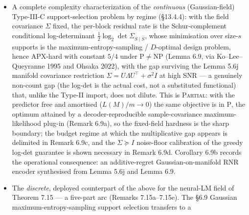 \documentclass[
]{article}
\begin{document}
\begin{itemize}
  (Theorem 6.8), and an extension of the same APX-hardness constant
  to the \emph{bit-cost} objective $L^{\mathrm{bit}} =
  L_{\mathrm{sym}} \cdot \lceil \log_2(|\Sigma|+K) \rceil$ within the
  Charikar normal-form grammar class on Berman-Karpinski-hard
  instances (Lemma 6.8b), via a ratio-preserving reduction exploiting
  monotonicity of $L^{\mathrm{bit}}$ in the vertex-cover size
  $|\sigma|$. The 8569/8568 constant derives from the
  Berman-Karpinski (1999) bound on Vertex-Cover-3 inapproximability
  propagated through the $15|V|+3|E|+k$ encoding overhead. The
  fixed-byte-alphabet case requires a fresh gap-preserving
  construction and we do not claim a specific constant for it;
  unrestricted bit-cost APX-hardness over all (non-Charikar-format)
  grammars and unrestricted-predictor joint hardness remain open.
\item
  A complete complexity characterization of the \emph{continuous}
  (Gaussian-field) Type-III-C support-selection problem by regime
  (§13.4.4): with the field covariance $\Sigma$ fixed, the per-block
  residual rate is the Schur-complement conditional log-determinant
  $\tfrac12\log_2\det\Sigma_{S\mid\bar S}$, whose minimisation over
  size-$s$ supports is the maximum-entropy-sampling / $D$-optimal
  design problem, hence APX-hard with constant $5/4$ under
  $\mathrm{P}\neq\mathrm{NP}$ (Lemma 6.9, via Ko--Lee--Queyranne 1995
  and Ohsaka 2022), with the gap surviving the Lemma 5.6j manifold
  covariance restriction $\Sigma=U\Lambda U^\top+\sigma^2 I$ at high
  SNR --- a genuinely non-count gap (the log-det is the actual cost,
  not a substituted functional) that, unlike the Type-II import,
  does not dilute. This is \textsc{Partial}: with the predictor free
  and amortised ($L(M)/m\to0$) the same objective is in $\mathrm{P}$,
  the optimum attained by a decoder-reproducible sample-covariance
  maximum-likelihood plug-in (Remark 6.9a), so the fixed-field
  hardness is the sharp boundary; the budget regime at which the
  multiplicative gap appears is delimited in Remark 6.9c, and the
  $\Sigma\succeq I$ noise-floor calibration of the greedy log-det
  guarantee is shown necessary in Remark 6.9d. Corollary 6.9b records
  the operational consequence: an additive-regret Gaussian-on-manifold
  RNR encoder synthesised from Lemma 5.6j and Lemma 6.9.
\item
  The \emph{discrete}, deployed counterpart of the above for the neural-LM
  field of Theorem 7.15 --- a five-part arc (Remarks 7.15a--7.15e). The
  §6.9 Gaussian maximum-entropy-sampling support selection transfers to a

\end{itemize}
\end{document}
